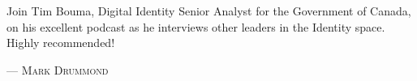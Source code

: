 
      Join Tim Bouma, Digital Identity Senior Analyst for the Government of Canada, on his excellent podcast as he interviews other leaders in the Identity space. Highly recommended!
  
\setlength{\parindent}{0cm}\par\textsc{ --- Mark Drummond }\par\vspace{12pt}\setlength{\parindent}{15pt}
